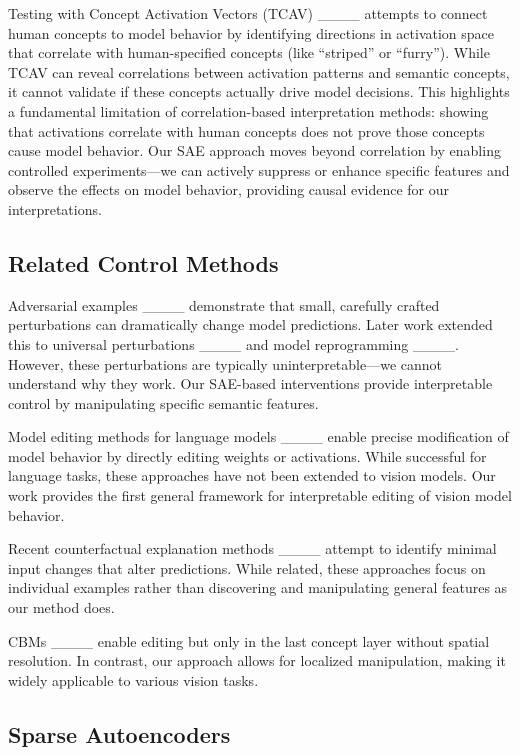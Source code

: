 Testing with Concept Activation Vectors (TCAV) ____ attempts to connect human concepts to model behavior by identifying directions in activation space that correlate with human-specified concepts (like ``striped'' or ``furry''). 
While TCAV can reveal correlations between activation patterns and semantic concepts, it cannot validate if these concepts actually drive model decisions. 
This highlights a fundamental limitation of correlation-based interpretation methods: showing that activations correlate with human concepts does not prove those concepts cause model behavior. 
Our SAE approach moves beyond correlation by enabling controlled experiments---we can actively suppress or enhance specific features and observe the effects on model behavior, providing causal evidence for our interpretations.

\subsection{Related Control Methods}

Adversarial examples ____ demonstrate that small, carefully crafted perturbations can dramatically change model predictions. Later work extended this to universal perturbations ____ and model reprogramming ____. 
However, these perturbations are typically uninterpretable---we cannot understand why they work. 
Our SAE-based interventions provide interpretable control by manipulating specific semantic features.

Model editing methods for language models ____ enable precise modification of model behavior by directly editing weights or activations. While successful for language tasks, these approaches have not been extended to vision models. Our work provides the first general framework for interpretable editing of vision model behavior.

Recent counterfactual explanation methods ____ attempt to identify minimal input changes that alter predictions. 
While related, these approaches focus on individual examples rather than discovering and manipulating general features as our method does.

CBMs ____ enable editing but only in the last concept layer without spatial resolution. 
In contrast, our approach allows for localized manipulation, making it widely applicable to various vision tasks.

\subsection{Sparse Autoencoders}

